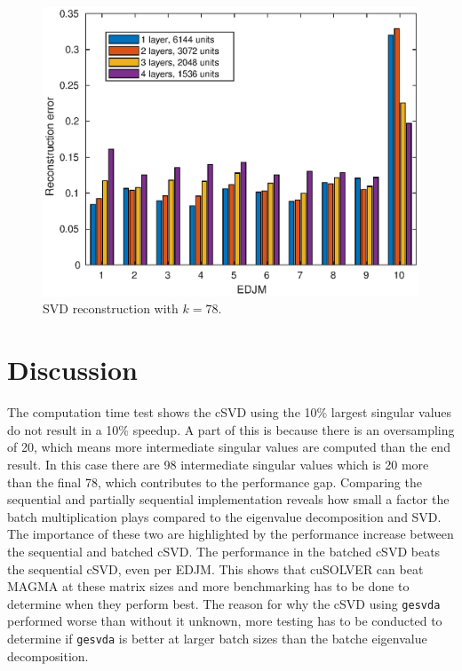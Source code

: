 \begin{figure}[H]
  \centering
  \includegraphics[scale=0.6]{Figures/svd_reconstruction.eps}
  \caption{SVD reconstruction with $k=78$.}
  \label{fig:svd:reconstruction}
\end{figure}

\newpage

\section{Discussion}


The computation time test shows the cSVD using the 10\% largest singular values do not result in a 10\% speedup. A part of this is because there is an oversampling of 20, which means more intermediate singular values are computed than the end result. In this case there are 98 intermediate singular values which is 20 more than the final 78, which contributes to the performance gap. Comparing the sequential and partially sequential implementation reveals how small a factor the batch multiplication plays compared to the eigenvalue decomposition and SVD. The importance of these two are highlighted by the performance increase between the sequential and batched cSVD. The performance in the batched cSVD beats the sequential cSVD, even per EDJM. This shows that cuSOLVER can beat MAGMA at these matrix sizes and more benchmarking has to be done to determine when they perform best. The reason for why the cSVD using \texttt{gesvda} performed worse than without it unknown, more testing has to be conducted to determine if \texttt{gesvda} is better at larger batch sizes than the batche eigenvalue decomposition.

